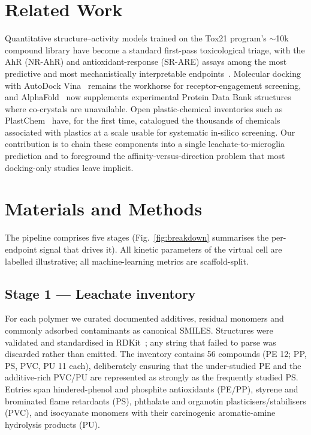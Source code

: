 \documentclass[journal]{IEEEtran}
\begin{document}
\section{Related Work}
Quantitative structure--activity models trained on the Tox21 program's $\sim$10k
compound library have become a standard first-pass toxicological triage, with the
AhR (NR-AhR) and antioxidant-response (SR-ARE) assays among the most predictive
and most mechanistically interpretable endpoints~\cite{richard2021}. Molecular
docking with AutoDock Vina~\cite{trott2010,eberhardt2021} remains the workhorse
for receptor-engagement screening, and AlphaFold~\cite{jumper2021} now supplements
experimental Protein Data Bank structures~\cite{berman2000} where co-crystals are
unavailable. Open plastic-chemical inventories such as PlastChem~\cite{plastchem2024}
have, for the first time, catalogued the thousands of chemicals associated with
plastics at a scale usable for systematic in-silico screening. Our contribution is
to chain these components into a single leachate-to-microglia prediction and to
foreground the affinity-versus-direction problem that most docking-only studies
leave implicit.

\section{Materials and Methods}
The pipeline comprises five stages (Fig.~\ref{fig:breakdown} summarises the
per-endpoint signal that drives it). All kinetic parameters of the virtual cell
are labelled illustrative; all machine-learning metrics are scaffold-split.

\subsection{Stage 1 --- Leachate inventory}
For each polymer we curated documented additives, residual monomers and commonly
adsorbed contaminants as canonical SMILES. Structures were validated and
standardised in RDKit~\cite{rdkit}; any string that failed to parse was discarded
rather than emitted. The inventory contains 56 compounds (PE 12; PP, PS, PVC, PU
11 each), deliberately ensuring that the under-studied PE and the additive-rich
PVC/PU are represented as strongly as the frequently studied PS. Entries span
hindered-phenol and phosphite antioxidants (PE/PP), styrene and brominated flame
retardants (PS), phthalate and organotin plasticisers/stabilisers (PVC), and
isocyanate monomers with their carcinogenic aromatic-amine hydrolysis products
(PU).
\end{document}
